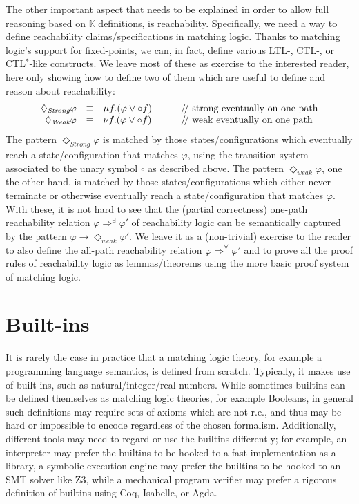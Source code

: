 \documentclass[UTF8,11pt]{article}
\theoremstyle{plain}
\theoremstyle{definition}
\theoremstyle{remark}
\newcommand{\K}{\mbox{$\mathbb{K}$}\xspace}
\newcommand{\doubleslash}{/\!/{ }}
\begin{document}
The other important aspect that needs to be explained in order to allow
full reasoning based on \K definitions, is reachability.
Specifically, we need a way to define reachability claims/specifications
in matching logic.
Thanks to matching logic's support for fixed-points, we can, in fact,
define various LTL-, CTL-, or CTL$^*$-like constructs.
We leave most of these as exercise to the interested reader,
here only showing how to define two of them which are useful to define
and reason about reachability:
$$
\begin{array}{rcl@{\hspace*{7ex}}l}
\Diamond_{\textit{Strong}} \varphi & \equiv & \mu f . (\varphi \vee \circ f)
& \textrm{\doubleslash strong eventually on one path}
\\
\Diamond_{\textit{Weak}} \varphi & \equiv & \nu f . (\varphi \vee \circ f)
& \textrm{\doubleslash weak eventually on one path}
\end{array}
$$
The pattern $\Diamond_{\textit{Strong}}\varphi$ is matched by those
states/configurations which eventually reach a state/configuration that
matches $\varphi$, using the transition system associated to the unary
symbol $\circ$ as described above.
The pattern $\Diamond_{\textit{weak}}\varphi$, one the other hand, is matched
by those states/configurations which either never terminate or otherwise
eventually reach a state/configuration that matches $\varphi$.
With these, it is not hard to see that the (partial correctness) one-path
reachability relation $\varphi \Rightarrow^\exists \varphi'$ of reachability
logic \cite{stefanescu-park-yuwen-li-rosu-2016-oopsla} can be semantically
captured by the pattern
$\varphi \rightarrow \Diamond_{\textit{weak}}\varphi'$.
We leave it as a (non-trivial) exercise to the reader to also define the
all-path reachability relation $\varphi \Rightarrow^\forall\varphi'$ and to
prove all the proof rules of reachability logic as lemmas/theorems using the
more basic proof system of matching logic.


\section{Built-ins}
\label{sec:builtins}

It is rarely the case in practice that a matching logic theory, for example
a programming language semantics, is defined from scratch.
Typically, it makes use of built-ins, such as natural/integer/real numbers.
While sometimes builtins can be defined themselves as matching logic theories,
for example Booleans, in general such definitions may require sets of axioms
which are not r.e., and thus may be hard or impossible to encode regardless
of the chosen formalism.
Additionally, different tools may need to regard or use the builtins
differently;
for example, an interpreter may prefer the builtins to be hooked to a
fast implementation as a library, a symbolic execution engine may prefer the
builtins to be hooked to an SMT solver like Z3, while a mechanical program
verifier may prefer a rigorous definition of builtins using Coq, Isabelle,
or Agda.
\end{document}
